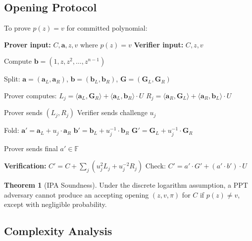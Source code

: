 \documentclass[11pt,a4paper]{article}
\theoremstyle{definition}
\newtheorem{theorem}{Theorem}
\begin{document}
\subsection{Opening Protocol}

To prove $p(z) = v$ for committed polynomial:

\begin{algorithm}
\caption{IPA Opening Protocol}
\begin{algorithmic}[1]
\State \textbf{Prover input:} $C, \mathbf{a}, z, v$ where $p(z) = v$
\State \textbf{Verifier input:} $C, z, v$

\State Compute $\mathbf{b} = (1, z, z^2, \ldots, z^{n-1})$ 

    \State Split: $\mathbf{a} = (\mathbf{a}_L, \mathbf{a}_R)$, $\mathbf{b} = (\mathbf{b}_L, \mathbf{b}_R)$, $\mathbf{G} = (\mathbf{G}_L, \mathbf{G}_R)$

    \State Prover computes:
    \State \quad $L_j = \langle \mathbf{a}_L, \mathbf{G}_R \rangle + \langle \mathbf{a}_L, \mathbf{b}_R \rangle \cdot U$
    \State \quad $R_j = \langle \mathbf{a}_R, \mathbf{G}_L \rangle + \langle \mathbf{a}_R, \mathbf{b}_L \rangle \cdot U$

    \State Prover sends $(L_j, R_j)$
    \State Verifier sends challenge $u_j$

    \State Fold:
    \State \quad $\mathbf{a}' = \mathbf{a}_L + u_j \cdot \mathbf{a}_R$
    \State \quad $\mathbf{b}' = \mathbf{b}_L + u_j^{-1} \cdot \mathbf{b}_R$
    \State \quad $\mathbf{G}' = \mathbf{G}_L + u_j^{-1} \cdot \mathbf{G}_R$
\EndFor

\State Prover sends final $a' \in \mathbb{F}$

\State \textbf{Verification:}
\State $C' = C + \sum_{j} (u_j^2 L_j + u_j^{-2} R_j)$
\State Check: $C' = a' \cdot G' + (a' \cdot b') \cdot U$
\end{algorithmic}
\end{algorithm}

\begin{theorem}[IPA Soundness]
    Under the discrete logarithm assumption, a PPT adversary cannot produce an accepting opening $(z, v, \pi)$ for $C$ if $p(z) \neq v$, except with negligible probability.
\end{theorem}

\subsection{Complexity Analysis}
\end{document}
